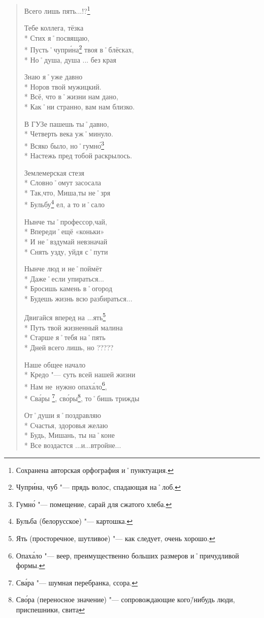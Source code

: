 \begin{verse}
Всего лишь пять...!?\footnote{Сохранена авторская орфография и˚пунктуация.}

Тебе коллега, тёзка           \\*
Стих я˚посвящаю,               \\*
Пусть˚чупр\'{и}на\footnote{Чупр\'{и}на, чуб "--- прядь волос, спадающая на˚лоб.} твоя в˚блёсках, \\*
Но˚душа, душа ... без края

Знаю я˚уже давно               \\*
Норов твой мужицкий.            \\*
Всё, что в˚жизни нам дано,      \\*
Как˚ни странно, вам нам близко.

В ГУЗе пашешь ты˚давно,         \\*
Четверть века уж˚минуло.        \\*
Всяко было, но˚гумн\'{о}\footnote{Гумн\'{о} "--- помещение, сарай для сжатого хлеба.}           \\*
Настежь пред тобой раскрылось. 

Землемерская стезя             \\*
Словно˚омут засосала           \\*
Так,что, Миша,ты не˚зря        \\*
Бульбу\footnote{Бульба (белорусское) "--- картошка.} ел, а то и˚сало

Нынче ты˚профессор,чай,        \\*
Впереди˚ещё «коньки»             \\*
И не˚вздумай невзначай         \\*
Снять узду, уйдя с˚пути  

Нынче люд и не˚поймёт          \\*
Даже˚если упираться...         \\*
Бросишь камень в˚огород        \\*
Будешь жизнь всю разбираться...

Двигайся вперед на ...ять\footnote{Ять (просторечное, шутливое) "--- как следует, очень хорошо.}      \\*
Путь твой жизненный малина     \\*
Старше я˚тебя на˚пять          \\*
Дней всего лишь, но ?????\todo[Неразборчиво]


Наше общее начало              \\*
Кредо "--- суть всей нашей жизни  \\*
Нам не~нужно опах\'{а}ло\footnote{Опах\'{а}ло "--- веер, преимущественно больших размеров и˚причудливой формы.},          \\*
Св\'{а}ры \footnote{Св\'{а}ра "--- шумная перебранка, ссора.}, св\'{о}ры\footnote{Св\'{о}ра (переносное значение) "--- сопровождающие кого\=/нибудь люди, приспешники, свита}, то˚бишь трижды 

От˚души я˚поздравляю           \\*
Счастья, здоровья желаю        \\*
Будь, Мишань, ты на˚коне       \\*
Все воздастся ...и...втройне...
\end{verse}